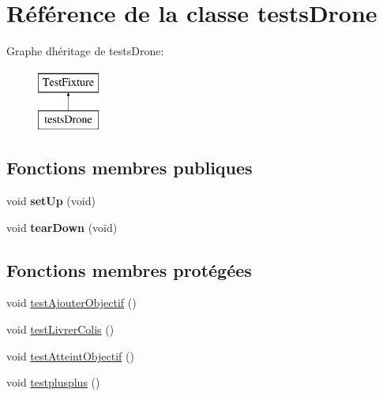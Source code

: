 \hypertarget{classtests_drone}{}\section{Référence de la classe tests\+Drone}
\label{classtests_drone}
Graphe d\textquotesingle{}héritage de tests\+Drone\+:\begin{figure}[H]
\begin{center}
\leavevmode
\includegraphics[height=2.000000cm]{classtests_drone}
\end{center}
\end{figure}
\subsection*{Fonctions membres publiques}
\begin{DoxyCompactItemize}
\item 
\mbox{\label{classtests_drone_a82cd9f57ec465b41c6f2eec9e1bf1930}} 
void {\bfseries set\+Up} (void)
\item 
\mbox{\label{classtests_drone_a89bb7ccbd1b705eb95c6efde0e4cc0cb}} 
void {\bfseries tear\+Down} (void)
\end{DoxyCompactItemize}
\subsection*{Fonctions membres protégées}
\begin{DoxyCompactItemize}
\item 
void \mbox{\hyperlink{classtests_drone_add1f7248206bee9d8e61ec4b2cd0731e}{test\+Ajouter\+Objectif}} ()
\item 
void \mbox{\hyperlink{classtests_drone_a6d3911d99922bf1a46f5209c66abe963}{test\+Livrer\+Colis}} ()
\item 
void \mbox{\hyperlink{classtests_drone_a3da2718fb45f6636f5f2d7c79030b418}{test\+Atteint\+Objectif}} ()
\item 
void \mbox{\hyperlink{classtests_drone_a7f3e884cbe3c28c276d7e9bae2b8bd53}{testplusplus}} ()
\end{DoxyCompactItemize}


